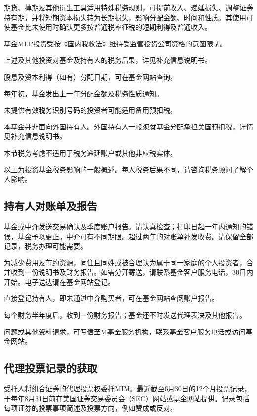 \documentclass[UTF8,fontset=none,11pt,a4paper]{ctexart}
\begin{document}
期货、掉期及其他衍生工具适用特殊税务规则，可提前收入、递延损失、调整证券持有期，并将短期资本损失转为长期损失，影响分配金额、时间和性质。其使用可使基金比未使用时确认更多按普通税率征税的短期利得及\allowbreak\mbox{普通收入。}


\par{}\label{originalpage22}

基金MLP投资受按《国内税收法》维持受监管投资公司资格的\allowbreak\mbox{意图限制。}

上述及其他投资对基金及持有人的税务后果，详见补充信\allowbreak\mbox{息说明书。}

股息及资本利得（如有）分配日期，可在基金网\allowbreak\mbox{站查询。}

每年初，基金发出上一年分配金额及税务\allowbreak\mbox{性质通知。}

未提供有效税务识别号码的投资者可能适用备\allowbreak\mbox{用预扣税。}

本基金并非面向外国持有人。外国持有人一般须就基金分配承担美国预扣税，详情见补充信\allowbreak\mbox{息说明书。}

本节税务考虑不适用于税务递延账户或其他非\allowbreak\mbox{应税实体。}

以上为投资基金税务影响的一般概述。每人税务后果不同，请咨询税务顾问了解\allowbreak\mbox{个人影响。}

\subsection*{持有人对账单及报告}\label{unitU821}
基金或中介发送交易确认及季度账户报告。请认真检查；打印日起一年内通知的错误，基金予以更正。中介可有不同期限。超过两年的对账单补发收费。请保留全部记录，税务办理\allowbreak\mbox{可能需要。}

为减少费用及节约资源，同住且同姓或被合理认为属于同一家庭的个人投资者，合并收到一份说明书及财务报告。如需分开寄送，请联系基金客户服务电话，30日内开始。电子送达请在基金网\allowbreak\mbox{站登记。}

直接登记持有人，即未通过中介购买者，可在基金网站查阅账\allowbreak\mbox{户报告。}

每个财务半年度后，收到一份财务报告；基金还不时发送代理表决及\allowbreak\mbox{其他报告。}

问题或其他资料请求，可写信至M基金服务机构，联系基金客户服务电话或访问基\allowbreak\mbox{金网站。}

\subsection*{代理投票记录的获取}\label{unitU827}
受托人将组合证券的代理投票权委托MIM。最近截至6月30日的12个月投票记录，于每年8月31日前在美国证券交易委员会（SEC）网站或基金网站提供。记录包括每项证券的投票事项简述及投票方向，例如赞成\allowbreak\mbox{或反对。}
\end{document}
